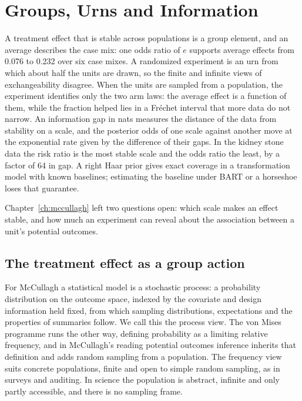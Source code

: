 \chapter{Groups, Urns and Information}\label{ch:groups}

\begin{tcolorbox}[colback=gray!6,colframe=gray!50,title=In brief,fonttitle=\normalfont\itshape,coltitle=black,colbacktitle=gray!15,boxrule=0.4pt,arc=1pt]
A treatment effect that is stable across populations is a group element, and an average describes the case mix: one odds ratio of $e$ supports average effects from 0.076 to 0.232 over six case mixes. A randomized experiment is an urn from which about half the units are drawn, so the finite and infinite views of exchangeability disagree. When the units are sampled from a population, the experiment identifies only the two arm laws: the average effect is a function of them, while the fraction helped lies in a Fr\'echet interval that more data do not narrow. An information gap in nats measures the distance of the data from stability on a scale, and the posterior odds of one scale against another move at the exponential rate given by the difference of their gaps. In the kidney stone data the risk ratio is the most stable scale and the odds ratio the least, by a factor of 64 in gap. A right Haar prior gives exact coverage in a transformation model with known baselines; estimating the baseline under BART or a horseshoe loses that guarantee.
\end{tcolorbox}

Chapter~\ref{ch:mccullagh} left two questions open: which scale makes an effect stable, and how much an experiment can reveal about the association between a unit's potential outcomes.



\section{The treatment effect as a group action}\label{gr:sec:group}

For McCullagh a statistical model is a stochastic process: a probability distribution on the outcome space, indexed by the covariate and design information held fixed, from which sampling distributions, expectations and the properties of summaries follow. We call this the process view. The von Mises programme runs the other way, defining probability as a limiting relative frequency, and in McCullagh's reading potential outcomes inference inherits that definition and adds random sampling from a population. The frequency view suits concrete populations, finite and open to simple random sampling, as in surveys and auditing. In science the population is abstract, infinite and only partly accessible, and there is no sampling frame. 

